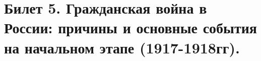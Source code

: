 \section{Билет 5. Гражданская война в России: причины и основные события на начальном этапе (1917-1918гг).}